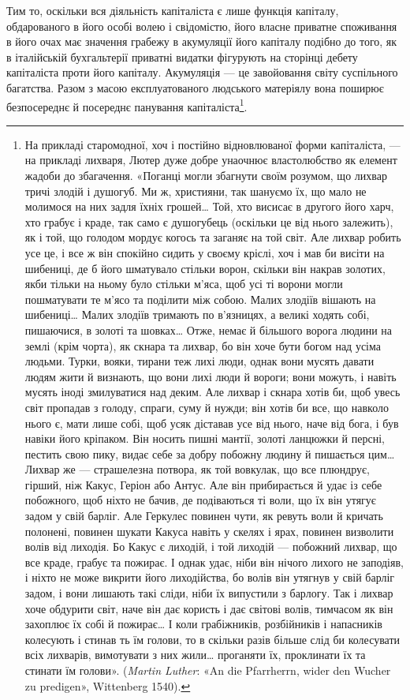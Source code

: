 Тим то, оскільки вся діяльність капіталіста є лише функція
капіталу, обдарованого в його особі волею і свідомістю, його
власне приватне споживання в його очах має значення грабежу
в акумуляції його капіталу подібно до того, як в італійській
бухгальтерії приватні видатки фігурують на сторінці дебету
капіталіста проти його капіталу. Акумуляція — це завойовання
світу суспільного багатства. Разом з масою експлуатованого людського
матеріялу вона поширює безпосереднє й посереднє панування
капіталіста\footnote{
На прикладі старомодної, хоч і постійно відновлюваної форми
капіталіста, — на прикладі лихваря, Лютер дуже добре унаочнює властолюбство
як елемент жадоби до збагачення. «Поганці могли збагнути
своїм розумом, що лихвар тричі злодій і душогуб. Ми ж, християни, так
шануємо їх, що мало не молимося на них задля їхніх грошей\dots{} Той, хто
висисає в другого його харч, хто грабує і краде, так само є душогубець
(оскільки це від нього залежить), як і той, що голодом мордує когось
та заганяє на той світ. Але лихвар робить усе це, і все ж він спокійно
сидить у своєму кріслі, хоч і мав би висіти на шибениці, де б його шматувало
стільки ворон, скільки він накрав золотих, якби тільки на ньому
було стільки м’яса, щоб усі ті ворони могли пошматувати те м’ясо та
поділити між собою. Малих злодіїв вішають на шибениці\dots{} Малих злодіїв
тримають по в’язницях, а великі ходять собі, пишаючися, в золоті
та шовках\dots{} Отже, немає й більшого ворога людини на землі (крім чорта),
як скнара та лихвар, бо він хоче бути богом над усіма людьми. Турки,
вояки, тирани теж лихі люди, однак вони мусять давати людям жити й
визнають, що вони лихі люди й вороги; вони можуть, і навіть мусять
іноді змилуватися над деким. Але лихвар і скнара хотів би, щоб увесь
світ пропадав з голоду, спраги, суму й нужди; він хотів би все, що навколо
нього є, мати лише собі, щоб усяк діставав усе від нього, наче від бога,
і був навіки його кріпаком. Він носить пишні мантії, золоті ланцюжки
й персні, пестить свою пику, видає себе за добру побожну людину
й пишається цим\dots{} Лихвар же — страшелезна потвора, як той вовкулак,
що все плюндрує, гірший, ніж Какус, Геріон або Антус. Але він
прибирається й удає із себе побожного, щоб ніхто не бачив, де подіваються
ті воли, що їх він утягує задом у свій барліг. Але Геркулес повинен
чути, як ревуть воли й кричать полонені, повинен шукати Какуса навіть
у скелях і ярах, повинен визволити волів від лиходія. Бо Какус є лиходій,
і той лиходій — побожний лихвар, що все краде, грабує та пожирає.
І однак удає, ніби він нічого лихого не заподіяв, і ніхто не може викрити
його лиходійства, бо волів він утягнув у свій барліг задом, і вони лишають
такі сліди, ніби їх випустили з барлогу. Так і лихвар хоче обдурити
світ, наче він дає користь і дає світові волів, тимчасом як він
захоплює їх собі й пожирає\dots{} І коли грабіжників, розбійників і напасників
колесують і стинав ть їм голови, то в скільки разів більше слід
би колесувати всіх лихварів, вимотувати з них жили\dots{} проганяти їх,
проклинати їх та стинати їм голови». (\emph{Martin Luther}: «An die Pfarrherrn,
wider den Wucher zu predigen», Wittenberg 1540).
}.

